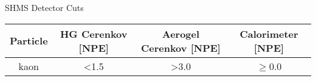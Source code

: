\begin{Mtable}{SHMS Detector Cuts}
  \centering
  \begin{tabular}{|c|c|c|c|}
    \hline
    \textbf{Particle} & \textbf{HG Cerenkov [NPE]} & \textbf{Aerogel Cerenkov [NPE]} & \textbf{Calorimeter [NPE]} \\
    \hline    
    kaon & <1.5 & >3.0 & $\ge$0.0 \\
    \hline
  \end{tabular}
  \caption{}
  \label{tab:3-3_shms_det_cuts}
\end{Mtable}
